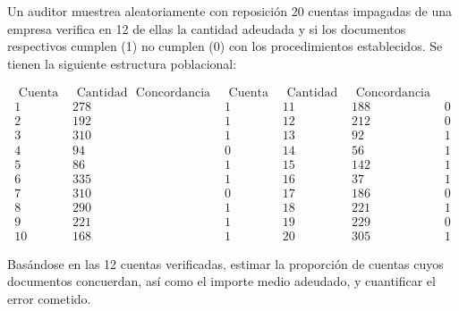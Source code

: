 

\question Un auditor muestrea aleatoriamente con reposición 20 cuentas impagadas de una empresa verifica en 12 de ellas la cantidad adeudada y si los documentos respectivos cumplen (1) no cumplen (0) con los procedimientos establecidos. Se tienen la siguiente estructura poblacional:

$$\begin{array}{lccccc}\text { Cuenta } & \text { Cantidad } \text { Concordancia } & \text { Cuenta } & \text { Cantidad } & \text { Concordancia } \\ 1 & 278 & 1 & 11 & 188 & 0 \\ 2 & 192 & 1 & 12 & 212 & 0 \\ 3 & 310 & 1 & 13 & 92 & 1 \\ 4 & 94 & 0 & 14 & 56 & 1 \\ 5 & 86 & 1 & 15 & 142 & 1 \\ 6 & 335 & 1 & 16 & 37 & 1 \\ 7 & 310 & 0 & 17 & 186 & 0 \\ 8 & 290 & 1 & 18 & 221 & 1 \\ 9 & 221 & 1 & 19 & 229 & 0 \\ 10 & 168 & 1 & 20 & 305 & 1\end{array}$$

Basándose en las 12 cuentas verificadas, estimar la proporción de cuentas cuyos documentos concuerdan, así como el importe medio adeudado, y cuantificar el error cometido.